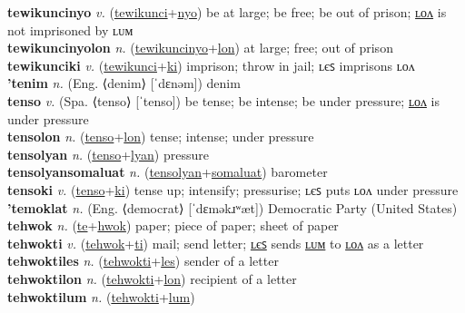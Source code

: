 \textbf{tewikuncinyo} \textit{v.} (\hyperref[tewikunci]{tewikunci}+\hyperref[nyo]{nyo})
be at large; be free; be out of prison; \hyperref[tewikuncinyolon]{ʟᴏᴧ} is not imprisoned by ʟᴜᴍ \label{tewikuncinyo} \\
\textbf{tewikuncinyolon} \textit{n.} (\hyperref[tewikuncinyo]{tewikuncinyo}+\hyperref[lon]{lon})
at large; free; out of prison \label{tewikuncinyolon} \\
\textbf{tewikunciki} \textit{v.} (\hyperref[tewikunci]{tewikunci}+\hyperref[ki]{ki})
imprison; throw in jail; ʟєꜱ imprisons ʟᴏᴧ \label{tewikunciki} \\
\textbf{'tenim} \textit{n.} (Eng. ⟨denim⟩ [ˈdɛnəm])
denim \label{'tenim} \\
\textbf{tenso} \textit{v.} (Spa. ⟨tenso⟩ [ˈtenso])
be tense; be intense; be under pressure; \hyperref[tensolon]{ʟᴏᴧ} is under pressure \label{tenso} \\
\textbf{tensolon} \textit{n.} (\hyperref[tenso]{tenso}+\hyperref[lon]{lon})
tense; intense; under pressure \label{tensolon} \\
\textbf{tensolyan} \textit{n.} (\hyperref[tenso]{tenso}+\hyperref[lyan]{lyan})
pressure \label{tensolyan} \\
\textbf{tensolyansomaluat} \textit{n.} (\hyperref[tensolyan]{tensolyan}+\hyperref[somaluat]{somaluat})
barometer \label{tensolyansomaluat} \\
\textbf{tensoki} \textit{v.} (\hyperref[tenso]{tenso}+\hyperref[ki]{ki})
tense up; intensify; pressurise; ʟєꜱ puts ʟᴏᴧ under pressure \label{tensoki} \\
\textbf{'temoklat} \textit{n.} (Eng. ⟨democrat⟩ [ˈdɛməkɹʷæt])
Democratic Party (United States) \label{'temoklat} \\
\textbf{tehwok} \textit{n.} (\hyperref[te]{te}+\hyperref[hwok]{hwok})
paper; piece of paper; sheet of paper \label{tehwok} \\
\textbf{tehwokti} \textit{v.} (\hyperref[tehwok]{tehwok}+\hyperref[ti]{ti})
mail; send letter; \hyperref[tehwoktiles]{ʟєꜱ} sends \hyperref[tehwoktilum]{ʟᴜᴍ} to \hyperref[tehwoktilon]{ʟᴏᴧ} as a letter \label{tehwokti} \\
\textbf{tehwoktiles} \textit{n.} (\hyperref[tehwokti]{tehwokti}+\hyperref[les]{les})
sender of a letter \label{tehwoktiles} \\
\textbf{tehwoktilon} \textit{n.} (\hyperref[tehwokti]{tehwokti}+\hyperref[lon]{lon})
recipient of a letter \label{tehwoktilon} \\
\textbf{tehwoktilum} \textit{n.} (\hyperref[tehwokti]{tehwokti}+\hyperref[lum]{lum})
